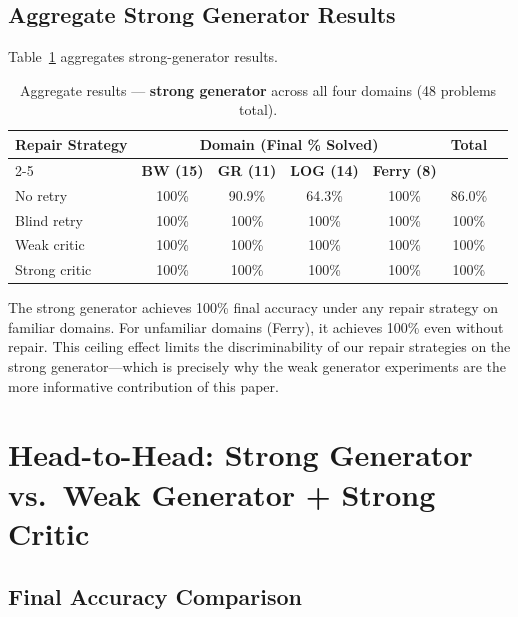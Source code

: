 \documentclass{article}
\begin{document}
\subsection{Aggregate Strong Generator Results}
\label{sec:agg_strong}

Table~\ref{tab:agg_strong} aggregates strong-generator results.

\begin{table}[h]
\centering
\caption{Aggregate results --- \textbf{strong generator} across all four domains (48 problems total).}
\label{tab:agg_strong}
\begin{tabular}{lcccccc}
\toprule
\multirow{2}{*}{\textbf{Repair Strategy}} &
  \multicolumn{4}{c}{\textbf{Domain (Final \% Solved)}} &
  \multirow{2}{*}{\textbf{Total}} \\
\cmidrule{2-5}
  & \textbf{BW (15)} & \textbf{GR (11)} & \textbf{LOG (14)} & \textbf{Ferry (8)} & \\
\midrule
No retry      & 100\%  & 90.9\%  & 64.3\%  & 100\%  & 86.0\% \\
Blind retry   & 100\%  & 100\%   & 100\%   & 100\%  & 100\%  \\
Weak critic   & 100\%  & 100\%   & 100\%   & 100\%  & 100\%  \\
Strong critic & 100\%  & 100\%   & 100\%   & 100\%  & 100\%  \\
\bottomrule
\end{tabular}
\end{table}

The strong generator achieves 100\% final accuracy under any repair strategy on
familiar domains.  For unfamiliar domains (Ferry), it achieves 100\% even without
repair.  This ceiling effect limits the discriminability of our repair strategies
on the strong generator---which is precisely why the weak generator experiments
are the more informative contribution of this paper.

\section{Head-to-Head: Strong Generator vs.\ Weak Generator + Strong Critic}
\label{sec:head_to_head}

\subsection{Final Accuracy Comparison}
\label{sec:acc_comparison}
\end{document}
